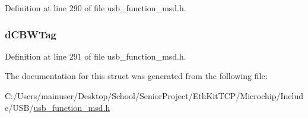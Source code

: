 Definition at line 290 of file usb\+\_\+function\+\_\+msd.\+h.

\hypertarget{struct___u_s_b___m_s_d___c_b_w_aa3f959927fe99de593e05ed62b2661a6}{}
\subsubsection[{d\+C\+B\+W\+Tag}]{ d\+C\+B\+W\+Tag}\label{struct___u_s_b___m_s_d___c_b_w_aa3f959927fe99de593e05ed62b2661a6}


Definition at line 291 of file usb\+\_\+function\+\_\+msd.\+h.



The documentation for this struct was generated from the following file\+:\begin{DoxyCompactItemize}
\item 
C\+:/\+Users/mainuser/\+Desktop/\+School/\+Senior\+Project/\+Eth\+Kit\+T\+C\+P/\+Microchip/\+Include/\+U\+S\+B/\hyperlink{usb__function__msd_8h}{usb\+\_\+function\+\_\+msd.\+h}\end{DoxyCompactItemize}
